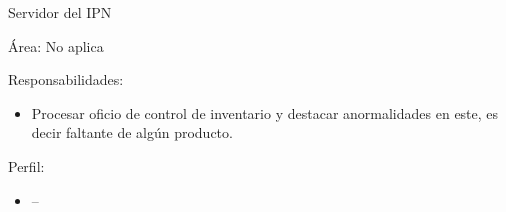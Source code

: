 \begin{Actor}{Servidor del IPN}{}
	\item[Área:] No aplica
	\item[Responsabilidades:] \hspace{1pt}
	\begin{itemize}
		\item Procesar oficio de control de inventario y destacar anormalidades en este, es decir faltante de algún producto.
	\end{itemize}
	\item[Perfil:] \hspace{1pt}
	\begin{itemize}
		\item --
	\end{itemize}
\end{Actor}





